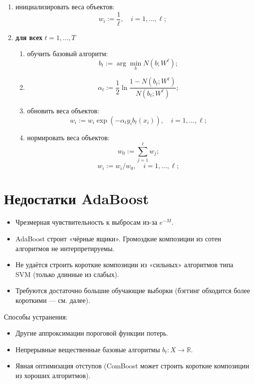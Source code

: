 \begin{enumerate}
    \item инициализировать веса объектов:
    \[
    w_i := \frac{1}{\ell}, \quad i = 1, \ldots, \ell;
    \]
    \item \textbf{для всех} $t = 1, \ldots, T$
    \begin{enumerate}
        \item обучить базовый алгоритм:
        \[
        b_t := \arg \min_b N(b; W^\ell);
        \]
        \item 
        \[
        \alpha_t := \frac{1}{2} \ln \frac{1 - N(b_t; W^\ell)}{N(b_t; W^\ell)};
        \]
        \item обновить веса объектов:
        \[
        w_i := w_i \exp(-\alpha_t y_i b_t(x_i)), \quad i = 1, \ldots, \ell;
        \]
        \item нормировать веса объектов:
        \[
        w_0 := \sum_{j=1}^{\ell} w_j;
        \]
        \[
        w_i := w_i / w_0, \quad i = 1, \ldots, \ell;
        \]
    \end{enumerate}
\end{enumerate}

\section*{Недостатки AdaBoost}

\begin{itemize}
    \item Чрезмерная чувствительность к выбросам из-за $e^{-M}$.
    \item AdaBoost строит «чёрные ящики». Громоздкие композиции из сотен алгоритмов не интерпретируемы.
    \item Не удаётся строить короткие композиции из «сильных» алгоритмов типа SVM (только длинные из слабых).
    \item Требуются достаточно большие обучающие выборки (бэггинг обходится более короткими — см. далее).
\end{itemize}

Способы устранения:
\begin{itemize}
    \item Другие аппроксимации пороговой функции потерь.
    \item Непрерывные вещественные базовые алгоритмы $b_t: X \to \mathbb{R}$.
    \item Явная оптимизация отступов (ComBoost может строить короткие композиции из хороших алгоритмов).
\end{itemize}

